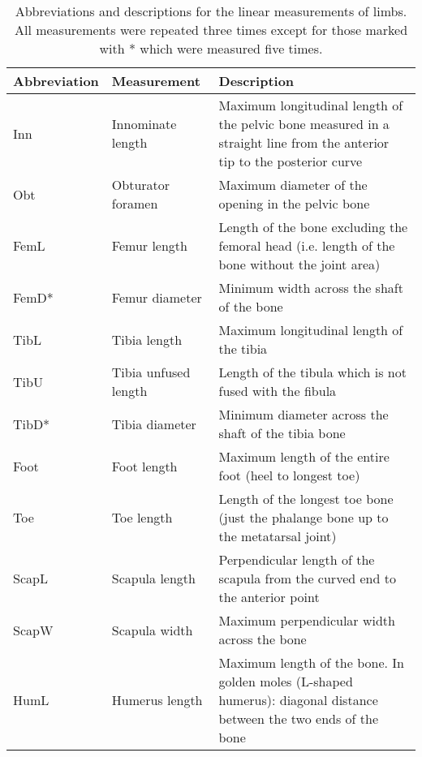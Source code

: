 \begin{center}
\begin{longtable} {p{2.4cm}p{3.2cm}p{9.5cm}}
\caption[Limb measurements] {Abbreviations and descriptions for the linear measurements of limbs. All measurements were repeated three times except for those marked with * which were measured five times.} \\

\hline
\textbf{Abbreviation} & \textbf{Measurement} & \textbf{Description}\\
\hline
Inn & Innominate length & Maximum longitudinal length of the pelvic bone measured in a straight line from the anterior tip to the posterior curve \\ 
Obt & Obturator foramen & Maximum diameter of the opening in the pelvic bone \\
FemL & Femur length & Length of the bone excluding the femoral head (i.e. length of the bone without the joint area)  \\
FemD* & Femur diameter & Minimum width across the shaft of the bone \\
TibL & Tibia length & Maximum longitudinal length of the tibia  \\
TibU & Tibia unfused length & Length of the tibula which is not fused with the fibula \\
TibD* & Tibia diameter & Minimum diameter across the shaft of the tibia bone \\
Foot & Foot length & Maximum length of the entire foot (heel to longest toe) \\
Toe & Toe length & Length of the longest toe bone (just the phalange bone up to the metatarsal joint) \\
ScapL & Scapula length & Perpendicular length of the scapula from the curved end to the anterior point  \\
ScapW & Scapula width & Maximum perpendicular width across the bone \\
HumL & Humerus length & Maximum length of the bone. In golden moles (L-shaped humerus): diagonal distance between the two ends of the bone  \\

\end{longtable}
\end{center}

